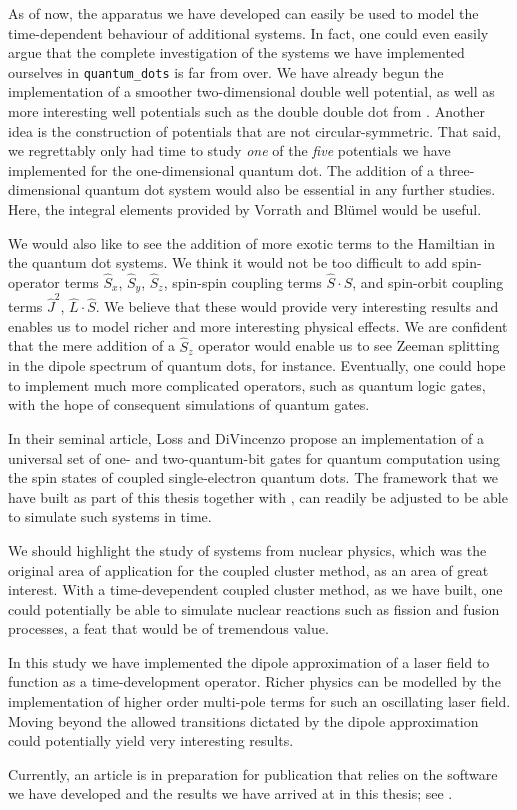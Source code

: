 As of now, the apparatus we have developed can easily be used to model 
the time-dependent behaviour of additional systems. In fact, one could even 
easily argue that the complete investigation of the systems we have implemented 
ourselves in \lstinline{quantum_dots} is far from over. We have already begun
the implementation of a smoother two-dimensional double well potential, as well as 
more interesting well potentials such as the double double dot 
from \citeauthor{nielsen2012configuration} \cite{nielsen2012configuration}. Another 
idea is the construction of potentials that are not circular-symmetric.
That said, we regrettably only had time to study \emph{one} of the
\emph{five} potentials we have implemented for the one-dimensional quantum dot.
The addition of a three-dimensional quantum dot system would also be essential 
in any further studies. Here, the integral elements provided by
Vorrath and Blümel \cite{vorrath2003electronic} would be useful.

We would also like to see the addition of more exotic terms to the Hamiltian in the 
quantum dot systems. We think it would not be too difficult to add spin-operator 
terms $\hat{S}_x$, $\hat{S}_y$, $\hat{S}_z$, spin-spin coupling terms
$\hat{S}\cdot\hat{S}$, and spin-orbit
coupling terms $\hat{J}^2$, $\hat{L}\cdot\hat{S}$. We believe that these would provide 
very interesting results and enables us to model richer and more interesting physical
effects. We are 
confident that the 
mere addition of a $\hat{S}_z$ operator would enable us to see Zeeman splitting in 
the dipole spectrum of quantum dots, for instance. Eventually, one could hope to 
implement much more complicated operators, such as quantum logic gates, with the 
hope of consequent simulations of quantum gates.

In their seminal article, Loss and DiVincenzo \cite{loss1998quantum} propose 
an implementation of a universal set of one- and two-quantum-bit gates for quantum
computation using the spin states of coupled single-electron quantum dots. The framework 
that we have built as part of this thesis together with \citeauthor{islandwind2019}, 
can readily be adjusted to be able to simulate such systems in time.

We should highlight the study of systems from nuclear physics, which was the original area 
of application for the coupled cluster method, as an area of great interest. With 
a time-devependent coupled cluster method, as we have built, one could potentially be able
to simulate  
nuclear reactions such as fission and fusion processes, a feat that would be of 
tremendous value.

In this study we have implemented the dipole approximation of a laser field to function 
as a time-development operator. 
Richer physics can be modelled by the implementation of higher order 
multi-pole terms for such an oscillating laser field. Moving beyond the allowed transitions
dictated by the dipole approximation could potentially yield very interesting results.

Currently, an article is in preparation for publication that relies on the 
software we have developed and the results we have arrived at in this thesis;
see \citeauthor{kristiansen2019time} \cite{kristiansen2019time}.

\clearemptydoublepage
